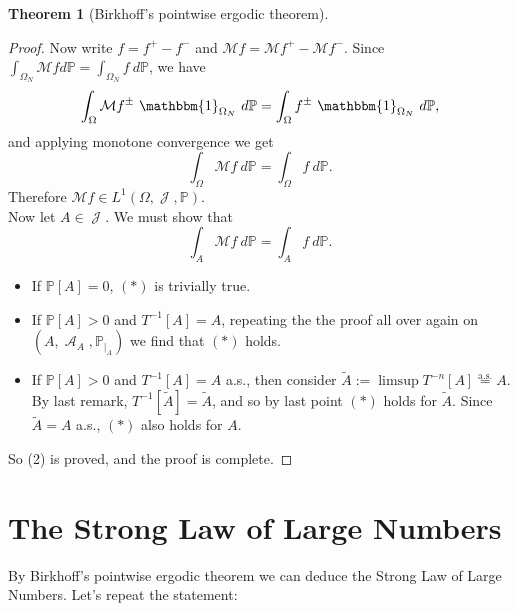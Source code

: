 \documentclass[12pt,a4paper]{report}
\theoremstyle{definition}
\newtheorem{theorem}{Theorem}[chapter] %
\theoremstyle{num.custom-title}
\DeclareMathOperator{\A}{\mathcal{A}}
\DeclareMathOperator{\J}{\mathcal{J}}
\newcommand{\M}{\mathcal{M}}
\renewcommand{\1}{\mathbbm{1}}
\renewcommand{\P}{\mathbb{P}}
\begin{document}
\begin{theorem}[Birkhoff's pointwise ergodic theorem]
\begin{proof}
Now write $f = f^+ - f^-$ and $\M f = \M f^+ - \M f^-$. Since $\int_{\Omega_N} \M f d\P = \int_{\Omega_N} f \ d\P$, we have
\[
\int_\Omega \M f^\pm \ \1_{\Omega_N} \ d\P = \int_\Omega f^\pm \ \1_{\Omega_N} \ d\P,
\]
and applying monotone convergence we get
\[
\int_\Omega \M f \ d\P = \int_\Omega f \ d\P.
\]
Therefore $\M f \in L^1(\Omega,\J,\P)$.\\
Now let $A \in \J$. We must show that
\[
\int_A \M f \ d\P = \int_A f \ d\P. \tag{$*$}
\]
\begin{itemize}
\item If $\P[A]=0$, $(*)$ is trivially true.
\item If $\P[A]>0$ and $T^{-1}[A]=A$, repeating the the proof all over again on $(A,\A_A,\P_{|_A})$ we find that $(*)$ holds. 
\item If $\P[A]>0$ and $T^{-1}[A]=A$ a.s., then consider $\tilde{A} := \limsup T^{-n}[A] \stackrel{\text{a.s.}}{=} A$. By last remark, $T^{-1}[\tilde{A}]=\tilde{A}$, and so by last point $(*)$ holds for $\tilde{A}$. Since $\tilde{A} = A$ a.s., $(*)$ also holds for $A$.
\end{itemize}
So (2) is proved, and the proof is complete.
\end{proof}
\end{theorem}

\section{The Strong Law of Large Numbers}

By Birkhoff's pointwise ergodic theorem we can deduce the Strong Law of Large Numbers. Let's repeat the statement:
\end{document}
